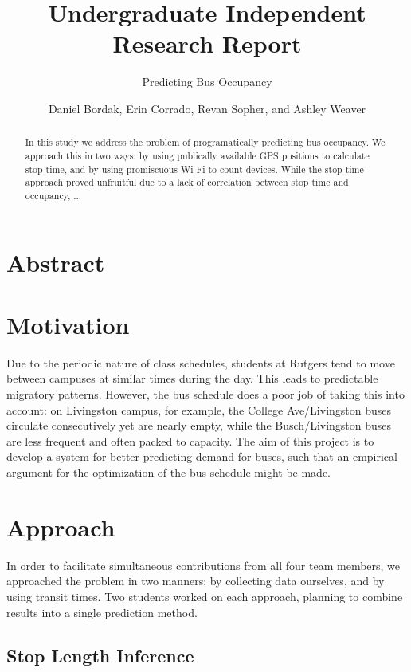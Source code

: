 \documentclass[letterpaper,english]{scrartcl}
\begin{document}
\title{Undergraduate Independent Research Report}
\subtitle{Predicting Bus Occupancy}
\author{Daniel Bordak, Erin Corrado, Revan Sopher, and Ashley Weaver}

\maketitle

\section*{Abstract}
\begin{abstract}
In this study we address the problem of programatically predicting bus occupancy.
We approach this in two ways: by using publically available GPS positions to calculate stop time, and by using promiscuous Wi-Fi to count devices.
While the stop time approach proved unfruitful due to a lack of correlation between stop time and occupancy, ...
\end{abstract}

\section*{Motivation}

Due to the periodic nature of class schedules, students at Rutgers tend to move between campuses at similar times during the day.
This leads to predictable migratory patterns. However, the bus schedule does a poor job of taking this into account: on Livingston campus, for example, the College Ave/Livingston buses circulate consecutively yet are nearly empty, while the Busch/Livingston buses are less frequent and often packed to capacity.
The aim of this project is to develop a system for better predicting demand for buses, such that an empirical argument for the optimization of the bus schedule might be made.

\section*{Approach}

In order to facilitate simultaneous contributions from all four team members, we approached the problem in two manners: by collecting data ourselves, and by using transit times.
Two students worked on each approach, planning to combine results into a single prediction method.

	\subsection*{Stop Length Inference}
\end{document}
